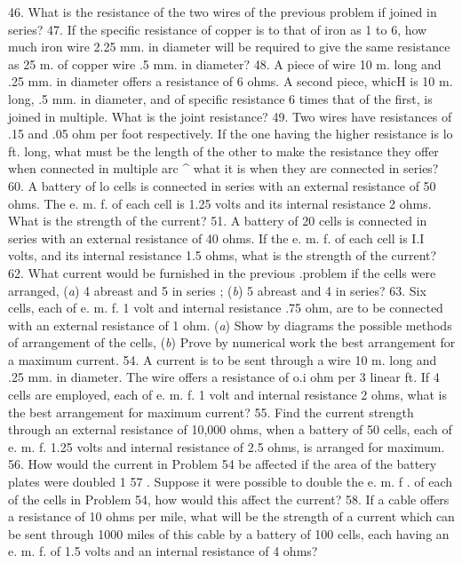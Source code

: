 46. What is the resistance of the two wires of the previous problem if joined in series?
47. If the specific resistance of copper is to that of iron as 1 to 6, how much iron wire 2.25 mm. in diameter will be required to give the same resistance as 25 m. of copper wire .5 mm. in diameter?
48. A piece of wire 10 m. long and .25 mm. in diameter offers a resistance of 6 ohms. A second piece, whicH is 10 m. long, .5 mm. in diameter, and of specific resistance 6 times that of the first, is joined in multiple. What is the joint resistance?
49. Two wires have resistances of .15 and .05 ohm per foot respectively. If the one having the higher resistance is lo ft. long, what must be the length of the other to make the resistance they offer when connected in multiple arc ^ what it is when they are connected in series?
60. A battery of lo cells is connected in series with an external resistance of 50 ohms. The e. m. f. of each cell is 1.25 volts and its internal resistance 2 ohms. What is the strength of the current?
51. A battery of 20 cells is connected in series with an external resistance of 40 ohms. If the e. m. f. of each cell is I.I volts, and its internal resistance 1.5 ohms, what is the strength of the current?
62. What current would be furnished in the previous .problem if the cells were arranged, (\emph{a}) 4 abreast and 5 in series ; (\emph{b}) 5 abreast and 4 in series?
63. Six cells, each of e. m. f. 1 volt and internal resistance .75 ohm, are to be connected with an external resistance of 1 ohm. (\emph{a}) Show by diagrams the possible methods of arrangement of the cells, (\emph{b}) Prove by numerical work the best arrangement for a maximum current.
54. A current is to be sent through a wire 10 m. long and .25 mm. in diameter. The wire offers a resistance of o.i ohm per 3 linear ft. If 4 cells are employed, each of e. m. f. 1 volt and internal resistance 2 ohms, what is the best arrangement for maximum current?
55. Find the current strength through an external resistance of 10,000 ohms, when a battery of 50 cells, each of e. m. f. 1.25 volts and internal resistance of 2.5 ohms, is arranged for maximum.
56. How would the current in Problem 54 be affected if the area of the battery plates were doubled 1
57 . Suppose it were possible to double the e. m. f . of each of the cells in Problem 54, how would this affect the current?
58. If a cable offers a resistance of 10 ohms per mile, what will be the strength of a current which can be sent through 1000 miles of this cable by a battery of 100 cells, each having an e. m. f. of 1.5 volts and an internal resistance of 4 ohms?
